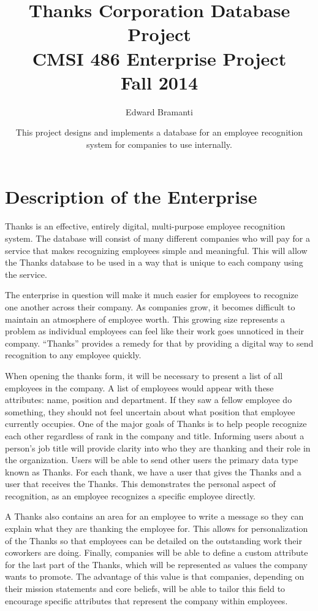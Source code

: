\documentclass[11pt]{report}
\title{Thanks Corporation Database Project\\CMSI 486 Enterprise Project\\Fall 2014}
\author{Edward Bramanti}
\date{This project designs and implements a database for an employee recognition system for companies to use internally.}
\providecommand\phantomsection{}
\begin{document}
\clearpage
\phantomsection
{}
\maketitle
\clearpage
\phantomsection
{}
\tableofcontents
\setcounter{page}{2}
\setcounter{chapter}{2}
\chapter{Description of the Enterprise}

\indent Thanks is an effective, entirely digital, multi-purpose employee recognition system. The database will consist of many different companies who will pay for a service that makes recognizing employees simple and meaningful. This will allow the Thanks database to be used in a way that is unique to each company using the service.

\indent The enterprise in question will make it much easier for employees to recognize one another across their company. As companies grow, it becomes difficult to maintain an atmosphere of employee worth. This growing size represents a problem as individual employees can feel like their work goes unnoticed in their company. “Thanks” provides a remedy for that by providing a digital way to send recognition to any employee quickly.

\indent When opening the thanks form, it will be necessary to present a list of all employees in the company. A list of employees would appear with these attributes: name, position and department. If they saw a fellow employee do something, they should not feel uncertain about what position that employee currently occupies. One of the major goals of Thanks is to help people recognize each other regardless of rank in the company and title. Informing users about a person's job title will provide clarity into who they are thanking and their role in the organization. Users will be able to send other users the primary data type known as Thanks. For each thank, we have a user that gives the Thanks and a user that receives the Thanks. This demonstrates the personal aspect of recognition, as an employee recognizes a specific employee directly.

\indent A Thanks also contains an area for an employee to write a message so they can explain what they are thanking the employee for. This allows for personalization of the Thanks so that employees can be detailed on the outstanding work their coworkers are doing. Finally, companies will be able to define a custom attribute for the last part of the Thanks, which will be represented as values the company wants to promote. The advantage of this value is that companies, depending on their mission statements and core beliefs, will be able to tailor this field to encourage specific attributes that represent the company within employees.
\end{document}

